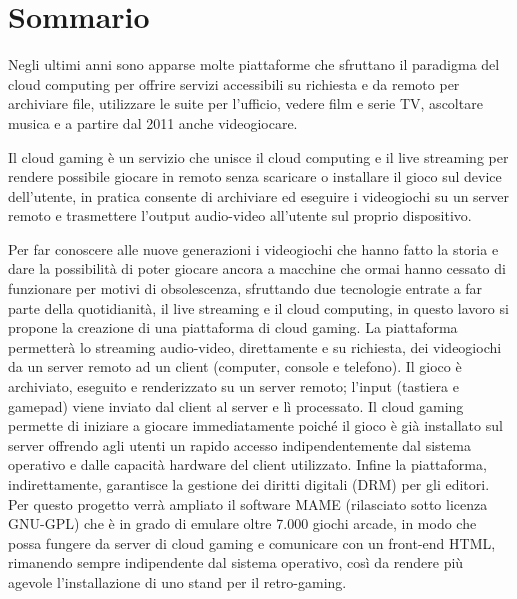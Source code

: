 %
%

\chapter*{Sommario}

Negli ultimi anni sono apparse molte piattaforme che sfruttano il paradigma del cloud computing per offrire servizi accessibili su richiesta e da remoto per archiviare file, utilizzare le suite per l'ufficio, vedere film e serie TV, ascoltare musica e a partire dal 2011 anche videogiocare.

Il cloud gaming è un servizio che unisce il cloud computing e il live streaming per rendere possibile giocare in remoto senza scaricare o installare il gioco sul device dell'utente, in pratica consente di archiviare ed eseguire i videogiochi su un server remoto e trasmettere l'output audio-video all'utente sul proprio dispositivo.

Per far conoscere alle nuove generazioni i videogiochi che hanno fatto la storia e dare la possibilità di poter giocare ancora a macchine che ormai hanno cessato di funzionare per motivi di obsolescenza, sfruttando due tecnologie entrate a far parte della quotidianità, il live streaming e il cloud computing, in questo lavoro si propone la creazione di una piattaforma di cloud gaming. La piattaforma permetterà lo streaming audio-video, direttamente e su richiesta, dei videogiochi da un server remoto ad un client (computer, console e telefono). Il gioco è archiviato, eseguito e renderizzato su un server remoto; l'input (tastiera e gamepad) viene inviato dal client al server e lì processato. Il cloud gaming permette di iniziare a giocare immediatamente poiché il gioco è già installato sul server offrendo agli utenti un rapido accesso indipendentemente dal sistema operativo e dalle capacità hardware del client utilizzato. Infine la piattaforma, indirettamente, garantisce la gestione dei diritti digitali (DRM) per gli editori. Per questo progetto verrà ampliato il software MAME (rilasciato sotto licenza GNU-GPL) che è in grado di emulare oltre 7.000 giochi arcade, in modo che possa fungere da server di cloud gaming e comunicare con un front-end HTML, rimanendo sempre indipendente dal sistema operativo, così da rendere più agevole l’installazione di uno stand per il retro-gaming.